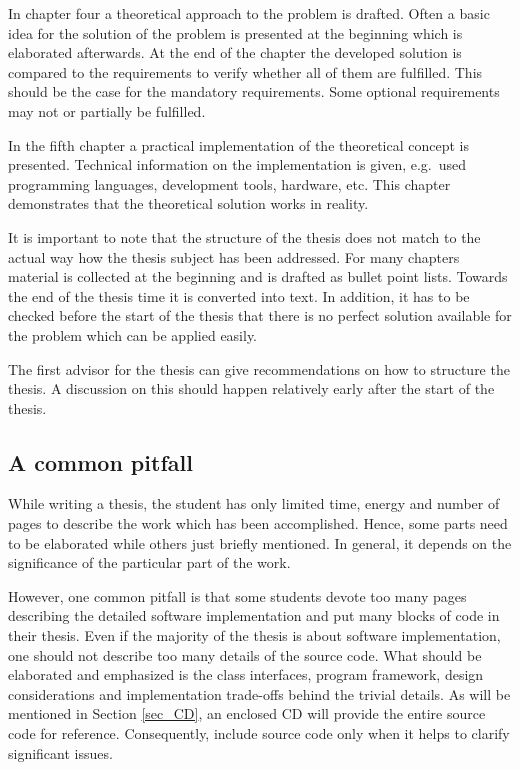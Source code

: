 In chapter four a theoretical approach to the problem is drafted. Often a basic idea for the solution of the problem is presented at the beginning which is elaborated afterwards. At the end of the chapter the developed solution is compared to the requirements to verify whether all of them are fulfilled. This should be the case for the mandatory requirements. Some optional requirements may not or partially be fulfilled.

In the fifth chapter a practical implementation of the theoretical concept is presented. Technical information on the implementation is given, e.g.~used programming languages, development tools, hardware, etc. This chapter demonstrates that the theoretical solution works in reality.

It is important to note that the structure of the thesis does not match to the actual way how the thesis subject has been addressed. For many chapters material is collected at the beginning and is drafted as bullet point lists. Towards the end of the thesis time it is converted into text. In addition, it has to be checked before the start of the thesis that there is no perfect solution available for the problem which can be applied easily.

The first advisor for the thesis can give recommendations on how to structure the thesis. A discussion on this should happen relatively early after the start of the thesis.

\subsection{A common pitfall} \label{sec_pitfall}

While writing a thesis, the student has only limited time, energy and number of pages to describe the work which has been accomplished. Hence, some parts need to be elaborated while others just briefly mentioned. In general, it depends on the significance of the particular part of the work. 

However, one common pitfall is that some students devote too many pages describing the detailed software implementation and put many blocks of code in their thesis. Even if the majority of the thesis is about software implementation, one should not describe too many details of the source code. What should be elaborated and emphasized is the class interfaces, program framework, design considerations and implementation trade-offs behind the trivial details. As will be mentioned in Section \ref{sec_CD}, an enclosed CD will provide the entire source code for reference. Consequently, include source code only when it helps to clarify significant issues.

